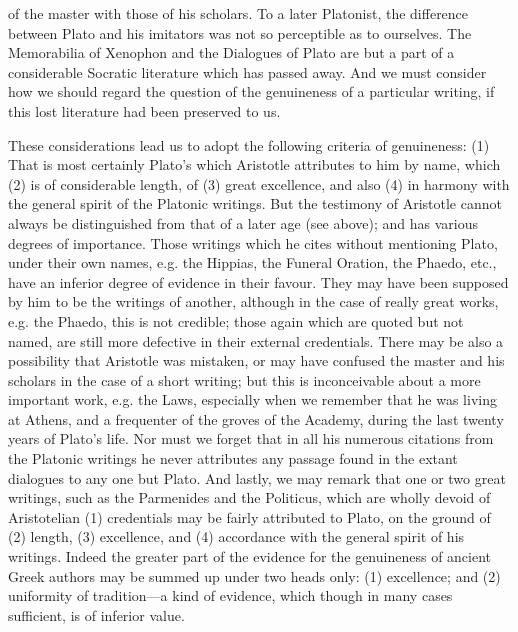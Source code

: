 \documentclass[11pt,letter]{article}
\begin{document}
of the master with those of his scholars. To a later Platonist, the difference between Plato and his imitators was not so perceptible as to ourselves. The Memorabilia of Xenophon and the Dialogues of Plato are but a part of a considerable Socratic literature which has passed away. And we must consider how we should regard the question of the genuineness of a particular writing, if this lost literature had been preserved to us.

\par  These considerations lead us to adopt the following criteria of genuineness: (1) That is most certainly Plato's which Aristotle attributes to him by name, which (2) is of considerable length, of (3) great excellence, and also (4) in harmony with the general spirit of the Platonic writings. But the testimony of Aristotle cannot always be distinguished from that of a later age (see above); and has various degrees of importance. Those writings which he cites without mentioning Plato, under their own names, e.g. the Hippias, the Funeral Oration, the Phaedo, etc., have an inferior degree of evidence in their favour. They may have been supposed by him to be the writings of another, although in the case of really great works, e.g. the Phaedo, this is not credible; those again which are quoted but not named, are still more defective in their external credentials. There may be also a possibility that Aristotle was mistaken, or may have confused the master and his scholars in the case of a short writing; but this is inconceivable about a more important work, e.g. the Laws, especially when we remember that he was living at Athens, and a frequenter of the groves of the Academy, during the last twenty years of Plato's life. Nor must we forget that in all his numerous citations from the Platonic writings he never attributes any passage found in the extant dialogues to any one but Plato. And lastly, we may remark that one or two great writings, such as the Parmenides and the Politicus, which are wholly devoid of Aristotelian (1) credentials may be fairly attributed to Plato, on the ground of (2) length, (3) excellence, and (4) accordance with the general spirit of his writings. Indeed the greater part of the evidence for the genuineness of ancient Greek authors may be summed up under two heads only: (1) excellence; and (2) uniformity of tradition—a kind of evidence, which though in many cases sufficient, is of inferior value.
\end{document}
